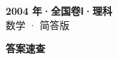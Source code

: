 \documentclass[zihao=-4, a4paper]{ctexart}
\begin{document}
\begin{center}
  {\Large\bfseries 2004 年·全国卷Ⅰ·理科}\\[4pt]
  {\large 数学 · 简答版}
\end{center}
\medskip
{}

\clearpage
{}
\begin{center}{\Large\bfseries 答案速查}\end{center}
\medskip

\end{document}

